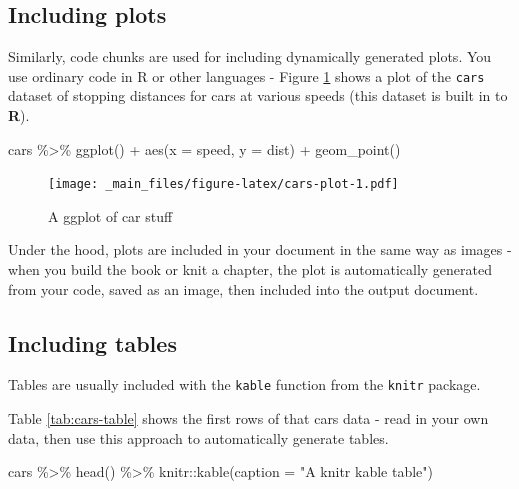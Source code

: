 \documentclass[a4paper, nobind]{templates/ociamthesis}
\newenvironment{Shaded}{\begin{snugshade}}{\end{snugshade}}
\newcommand{\AttributeTok}[1]{\textcolor[rgb]{0.77,0.63,0.00}{#1}}
\newcommand{\FunctionTok}[1]{\textcolor[rgb]{0.00,0.00,0.00}{#1}}
\newcommand{\NormalTok}[1]{#1}
\newcommand{\SpecialCharTok}[1]{\textcolor[rgb]{0.00,0.00,0.00}{#1}}
\newcommand{\StringTok}[1]{\textcolor[rgb]{0.31,0.60,0.02}{#1}}
\renewenvironment{Shaded}
{
  \vspace{10pt}%
  \begin{snugshade}%
}{%
  \end{snugshade}%
  \vspace{8pt}%
}
\begin{document}
\hypertarget{including-plots}{%
\subsection{Including plots}\label{including-plots}}

Similarly, code chunks are used for including dynamically generated plots.
You use ordinary code in R or other languages - Figure \ref{fig:cars-plot} shows a plot of the \texttt{cars} dataset of stopping distances for cars at various speeds (this dataset is built in to \textbf{R}).

\begin{Shaded}
\begin{Highlighting}[]
\NormalTok{cars }\SpecialCharTok{\%\textgreater{}\%} 
  \FunctionTok{ggplot}\NormalTok{() }\SpecialCharTok{+}
    \FunctionTok{aes}\NormalTok{(}\AttributeTok{x =}\NormalTok{ speed, }\AttributeTok{y =}\NormalTok{ dist) }\SpecialCharTok{+}
    \FunctionTok{geom\_point}\NormalTok{()}
\end{Highlighting}
\end{Shaded}

\begin{figure}
\centering
\texttt{[image: \_main\_files/figure-latex/cars-plot-1.pdf]}
\caption{\label{fig:cars-plot}A ggplot of car stuff}
\end{figure}

Under the hood, plots are included in your document in the same way as images - when you build the book or knit a chapter, the plot is automatically generated from your code, saved as an image, then included into the output document.

\hypertarget{including-tables}{%
\subsection{Including tables}\label{including-tables}}

Tables are usually included with the \texttt{kable} function from the \texttt{knitr} package.

Table \ref{tab:cars-table} shows the first rows of that cars data - read in your own data, then use this approach to automatically generate tables.

\begin{Shaded}
\begin{Highlighting}[]
\NormalTok{cars }\SpecialCharTok{\%\textgreater{}\%} 
  \FunctionTok{head}\NormalTok{() }\SpecialCharTok{\%\textgreater{}\%} 
\NormalTok{  knitr}\SpecialCharTok{::}\FunctionTok{kable}\NormalTok{(}\AttributeTok{caption =} \StringTok{"A knitr kable table"}\NormalTok{)}
\end{Highlighting}
\end{Shaded}
\end{document}
